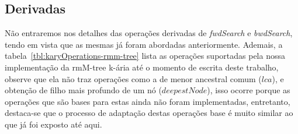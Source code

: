      \subsection{Derivadas}
     Não entraremos nos detalhes das operações derivadas de \textit{fwdSearch} e \textit{bwdSearch}, tendo em vista que as mesmas já foram abordadas anteriormente. 
     Ademais, a tabela~\ref{tbl:karyOperations-rmm-tree} lista as operações suportadas pela nossa implementação da rmM-tree k-ária até o momento de escrita deste trabalho, 
    observe que ela não traz operações como a de menor ancestral comum ($lca$), e obtenção de filho mais profundo de um nó ($deepestNode$), 
     isso ocorre porque as operações que são bases para estas ainda não foram implementadas, entretanto, destaca-se que o processo de adaptação destas operações base é muito similar ao que já foi exposto até aqui.

     




